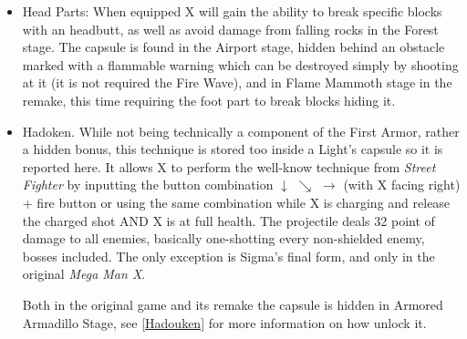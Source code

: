 \begin{itemize}
	\item Head Parts: When equipped X will gain the ability to break specific blocks with an headbutt, as well as avoid damage from falling rocks in the Forest stage. The capsule is found in the Airport stage, hidden behind an obstacle marked with a flammable warning which can be destroyed simply by shooting at it (it is not required the Fire Wave), and in Flame Mammoth stage in the remake, this time requiring the foot part to break blocks hiding it.
	
	\item Hadoken. While not being technically a component of the First Armor, rather a hidden bonus, this technique is stored too inside a Light's capsule so it is reported here. It allows X to perform the well-know technique from \textit{Street Fighter} by inputting the button combination $\downarrow$ $\searrow$ $\rightarrow$ (with X facing right) + fire button or using the same combination while X is charging and release the charged shot\cite{RTA_wiki:X1}  AND X is at full health. The projectile deals 32 point of damage\cite{wiki:Hadoken} to all enemies, basically one-shotting every non-shielded enemy, bosses included. The only exception is Sigma's final form, and only in the original \textit{Mega Man X}. 
	
	Both in the original game and its remake the capsule is hidden in Armored Armadillo Stage, see \ref{Hadouken} for more information on how unlock it.
\end{itemize}
